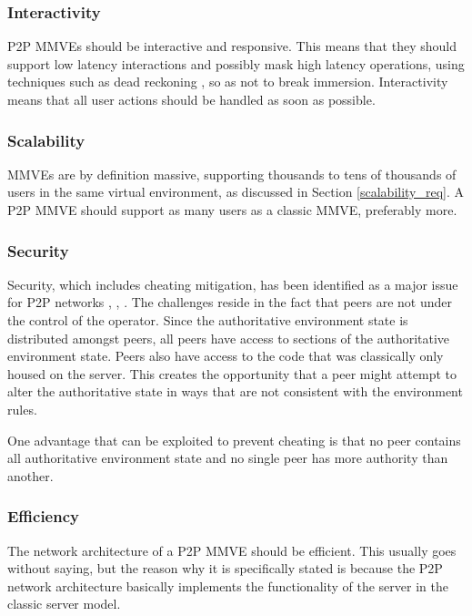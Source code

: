 \subsubsection{Interactivity}

P2P MMVEs should be interactive and responsive. This means that they should support low latency interactions and possibly mask high latency operations, using techniques such as dead reckoning \cite{cheat_proof_playout}, so as not to break immersion. Interactivity means that all user actions should be handled as soon as possible.

\subsubsection{Scalability}

MMVEs are by definition massive, supporting thousands to tens of thousands of users in the same virtual environment, as discussed in Section \ref{scalability_req}. A P2P MMVE should support as many users as a classic MMVE, preferably more.

\subsubsection{Security}

Security, which includes cheating mitigation, has been identified as a major issue for P2P networks \cite{knutsson_p2p_first}, \cite{challenges_p2p_gaming}, \cite{cheat_proof_event_ordering}. The challenges reside in the fact that peers are not under the control of the operator. Since the authoritative environment state is distributed amongst peers, all peers have access to sections of the authoritative environment state. Peers also have access to the code that was classically only housed on the server. This creates the opportunity that a peer might attempt to alter the authoritative state in ways that are not consistent with the environment rules.

One advantage that can be exploited to prevent cheating is that no peer contains all authoritative environment state and no single peer has more authority than another.

\subsubsection{Efficiency}

The network architecture of a P2P MMVE should be efficient. This usually goes without saying, but the reason why it is specifically stated is because the P2P network architecture basically implements the functionality of the server in the classic server model.


